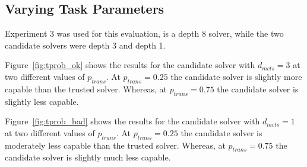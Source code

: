 \subsection{Varying Task Parameters}
Experiment 3 was used for this evaluation, \solverstar{} is a depth 8 solver, while the two candidate solvers were depth 3 and depth 1.

Figure~\ref{fig:tprob_ok} shows the results for the candidate solver with $d_{mcts}=3$ at two different values of $p_{trans}$. At $p_{trans}=0.25$ the candidate solver is slightly more capable than the trusted solver. Whereas, at $p_{trans}=0.75$ the candidate solver is slightly less capable.

Figure~\ref{fig:tprob_bad} shows the results for the candidate solver with $d_{mcts}=1$ at two different values of $p_{trans}$. At $p_{trans}=0.25$ the candidate solver is moderately less capable than the trusted solver. Whereas, at $p_{trans}=0.75$ the candidate solver is slightly much less capable.

